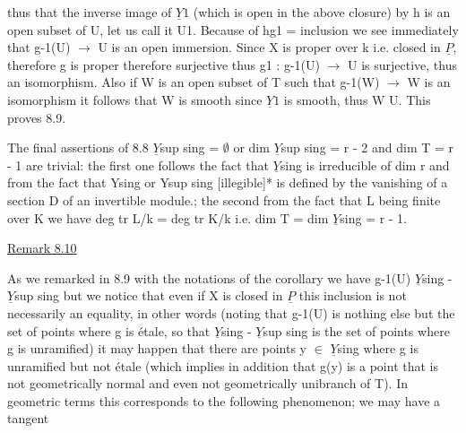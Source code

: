 
thus that the inverse image of $\underline{Y}1$ (which is open in the above
closure) by h is an open subset of U, let us call it U1.  Because
of hg1 = inclusion we see immediately that g-1(U) $\to$ U is an open
immersion.  Since X is proper over k i.e. closed in $\underline{P}$, therefore g
is proper therefore surjective thus g1 : g-1(U) $\to$ U is
surjective, thus an isomorphism.  Also if W is an open subset of T
such that g-1(W) $\to$ W is an isomorphism it follows that W is smooth
since $\underline{Y}1$ is smooth, thus W \hand{$\subset$} U.  This proves 8.9.

The final assertions of 8.8 $\underline{Y}$sup sing = $\emptyset$ or dim $\underline{Y}$sup sing =
r - 2 and dim T = r - 1 are trivial:  the first one follows the
fact that $\underline{Y}$sing is irreducible of dim r and from the fact that Ysing
or Ysup sing [illegible]* is defined by the vanishing of a section D
of an invertible module.; the second from the fact that L being
finite over K we have deg tr L/k = deg tr K/k i.e. dim T = dim
$\underline{Y}$sing = r - 1.

\uline{Remark 8.10}

As we remarked in 8.9 with the notations of the corollary we
have g-1(U) \hand{$\subset$} $\underline{Y}$sing - $\underline{Y}$sup sing but we notice that even if X is
closed in $\underline{P}$ this inclusion is not necessarily an equality, in
other words (noting that g-1(U) is nothing else but the set of
points where g is étale, so that $\underline{Y}$sing - $\underline{Y}$sup sing is the set of
points where g is unramified) it may happen that there are points
y $\in$ $\underline{Y}$sing where g is unramified but not étale (which implies in
addition that g(y) is a point that is not geometrically normal and
even not geometrically unibranch of T).  In geometric terms this
corresponds to the following phenomenon; we may have a tangent

